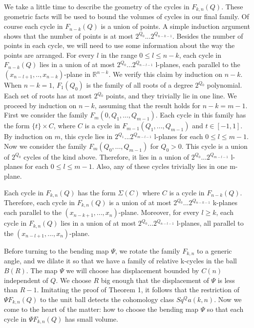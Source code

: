 \documentclass{amsart}
\newtheorem*{Theorem 1}{Theorem 1}
\newtheorem*{Theorem 2}{Theorem 2}
\newtheorem*{Theorem 1A}{Theorem 1A}
\newtheorem*{Theorem 2A}{Theorem 2A}
\newtheorem*{vanishing lemma}{Vanishing Lemma}
\numberwithin{equation}{section}
\begin{document}
We take a little time to describe the geometry of the cycles in
$F_{k,n}(Q)$. These geometric facts will be used to bound the
volumes of cycles in our final family.  Of course each cycle in
$F_{n-k}(Q)$ is a union of points.  A simple induction argument
shows that the number of points is at most $2^{Q_0} ...
2^{Q_{n-k-1}}$. Besides the number of points in each cycle, we
will need to use some information about the way the points are
arranged.  For every $l$ in the range $0 \le l \le n-k$, each
cycle in $F_{n-k}(Q)$ lies in a union of at most $2^{Q_0} ...
2^{Q_{n-l-1}}$ l-planes, each parallel to the $(x_{n-l+1}, ..,
x_{n-k})$-plane in $\mathbb{R}^{n-k}$.  We verify this claim by
induction on $n-k$.  When $n-k=1$, $F_1(Q_0)$ is the family of
all roots of a degree $2^{Q_0}$ polynomial.  Each set of roots
has at most $2^{Q_0}$ points, and they trivially lie in one line. 
We proceed by induction on $n-k$, assuming that the result holds
for $n-k = m-1$.  First we consider the family $F_m(0, Q_1, ...,
Q_{m-1})$.  Each cycle in this family has the form $\{ t \}
\times C$, where $C$ is a cycle in $F_{m-1}(Q_1, ..., Q_{m-1})$
and $t \in [-1, 1]$.  By induction on $m$, this cycle lies in
$2^{Q_1} ... 2^{Q_{m-l-1}}$ l-planes for each $0 \le l \le m-1$. 
Now we consider the family $F_m(Q_0, ..., Q_{m-1})$ for $Q_0 >
0$.  This cycle is a union of $2^{Q_0}$ cycles of the kind above. 
Therefore, it lies in a union of $2^{Q_0} ... 2^{Q_{m-l-1}}$
l-planes for each $0 \le l \le m-1$.  Also, any of these cycles
trivially lies in one m-plane.

Each cycle in $F_{k,n}(Q)$ has the form $\Sigma(C)$ where $C$ is
a cycle in $F_{n-k}(Q)$.  Therefore, each cycle in $F_{k,n}(Q)$
is a union of at most $2^{Q_0} ... 2^{Q_{n-k-1}}$ k-planes each
parallel to the $(x_{n-k+1}, ..., x_n)$-plane. Moreover, for
every $l \ge k$, each cycle in $F_{k,n}(Q)$ lies in a union of at
most $2^{Q_0} ... 2^{Q_{n-l-1}}$ l-planes, all parallel to the
$(x_{n-l+1}, ..., x_n)$-plane.

Before turning to the bending map $\Psi$, we rotate the family
$F_{k,n}$ to a generic angle, and we dilate it so that we have a
family of relative k-cycles in the ball $B(R)$.  The map $\Psi$
we will choose has displacement bounded by $C(n)$ independent of
$Q$.  We choose $R$ big enough that the displacement of $\Psi$ is
less than $R-1$.  Imitating the proof of Theorem 1, it follows
that the restriction of $\Psi F_{k,n}(Q)$ to the unit ball
detects the cohomology class $Sq^Q a(k,n)$. Now we come to the
heart of the matter: how to choose the bending map $\Psi$ so that
each cycle in $\Psi F_{k,n}(Q)$ has small volume.
\end{document}
